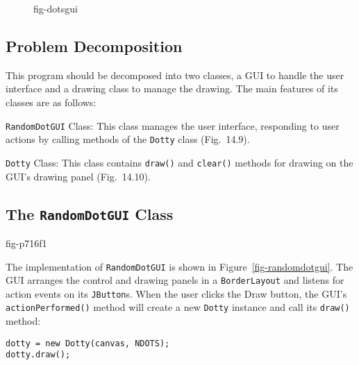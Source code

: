 \begin{figure}[tb]
{fig-dotsgui}

\end{figure}

\subsection*{Problem Decomposition}

\noindent This program should be decomposed into two classes, a GUI to handle
the user interface and a drawing class to manage the drawing.
The main features of its classes are as follows:

\begin{BL}
\item  {\tt RandomDotGUI} Class: This class manages the user interface,
responding to user actions by calling methods of the {\tt Dotty} class
(Fig.~14.9).

\item  {\tt Dotty} Class:  This class contains {\tt draw()} and {\tt clear()}
methods for drawing on the GUI's drawing panel (Fig.~14.10).
\end{BL}



\subsection*{The {\tt RandomDotGUI} Class}
{fig-p716f1}

\noindent The implementation of {\tt RandomDotGUI} is shown in
Figure~\ref{fig-randomdotgui}.  The GUI arranges the control and
drawing panels in a {\tt BorderLayout} and listens for action events
on its {\tt JButton}s.  When the user clicks the Draw button, the
GUI's {\tt action\-Per\-formed()} method will create a new {\tt Dotty}
instance and call its {\tt draw()} method:

\begin{jjjlisting}
\begin{lstlisting}
dotty = new Dotty(canvas, NDOTS);
dotty.draw();
\end{lstlisting}
\end{jjjlisting}

